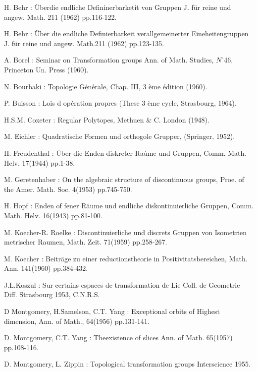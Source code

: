 \begin{thebibliography}{99}
 H. Behr :   \"Uber\pageoriginale die endliche
  Defininerbarketit von Gruppen  J. f\"ur reine und
  angew. Math. 211 (1962) pp.116-122.   

 H. Behr : \"Uber die endliche Definierbarkeit verallgemeinerter
  Eineheitengruppen J. f\"ur reine und angew. Math.211 (1962) pp.123-135. 

 {A. Borel} : Seminar on Transformation groups Ann. of
  Math. Studies, $N^\circ$46, Princeton Un. Press (1960). 

 {N. Bourbaki} : Topologie G\'en\'erale, Chap. III, 3
  \`eme \'edition (1960). 

 {P. Buisson} : Lois d op\'eration propres (These 3 \`eme
  cycle, Strasbourg, 1964). 

 {H.S.M. Coxeter} : Regular Polytopes, Methuen \& C. London (1948).

 {M. Eichler} : Quadratische Formen und orthogole Grupper,
  (Springer, 1952).   

 {H. Freudenthal} : \"Uber die Enden diskreter Ra\.ume und Gruppen,
  Comm. Math. Helv. 17(1944) pp.1-38. 

 {M. Geretenhaber} : On the algebraic structure of
  discontinuous groups, Proe. of the
  Amer. Math. Soc. 4(1953) pp.745-750. 

 {H. Hopf} : Enden of fener R\"aume und endliche
  diskontinuierliche Gruppen, Comm. Math. Helv. 16(1943) pp.81-100. 

 {M. Koecher-R. Roelke} : Discontinuierliche und discrets
  Gruppen von Isometrien metrischer Raumen,
  Math. Zeit. 71(1959) pp.258-267. 

 {M. Koecher} : Beitr\"age zu einer reductionstheorie in
  Positivitatsbereichen, Math. Ann. 141(1960) pp.384-432.  

 {J.L.Koszul} : Sur certains espaces de transformation de Lie
  Coll. de Geometrie Diff. Strasbourg 1953, C.N.R.S. 

 {D Montgomery, H.Samelson, C.T. Yang} :  Exceptional
  orbits of Highest dimension, Ann. of Math., 64(1956) pp.131-141.  

 {D. Montgomery, C.T. Yang} : The\pageoriginale existence
  of slices Ann. of Math. 65(1957) pp.108-116. 

 {D. Montgomery, L. Zippin} : Topological transformation groups
  Interscience 1955. 


\end{thebibliography}
